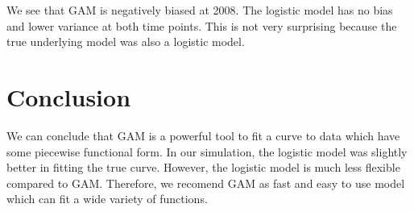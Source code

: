 \documentclass{article}\usepackage[]{graphicx}\usepackage[]{color}
\begin{document}
We see that GAM is negatively biased at 2008. The logistic model has no bias and lower variance at both time points. This is not very surprising because the true underlying model was also a logistic model.


\section{Conclusion}

We can conclude that GAM is a powerful tool to fit a curve to data which have some piecewise functional form. In our simulation, the logistic model was slightly better in fitting the true curve. However, the logistic model is much less flexible compared to GAM. Therefore, we recomend GAM as fast and easy to use model which can fit a wide variety of functions.



\end{document}
